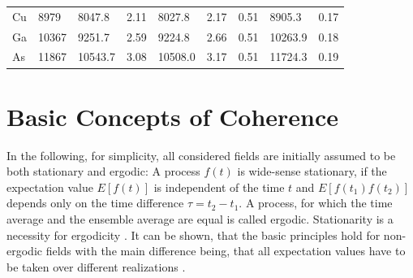 \begin{table}
\begin{tabular}{l|l|ll|lll|ll}
		Cu      & 8979                                                   & 8047.8                                                & 2.11                                                 & 8027.8                                                & 2.17                                                 & 0.51                                                      & 8905.3                                                & 0.17                                                      \\
		Ga      & 10367                                                  & 9251.7                                                 & 2.59                                                 & 9224.8                                                 & 2.66                                                 & 0.51                                                      & 10263.9                                               & 0.18                                                      \\
		As      & 11867                                                  & 10543.7                                                & 3.08                                                 & 10508.0                                                & 3.17                                                 & 0.51                                                      & 11724.3                                               & 0.19                                                      \\ \hline
	\end{tabular}
\end{table}

\section{Basic Concepts of Coherence}
In the following, for simplicity, all considered fields are initially assumed to be both stationary and ergodic: A process $f(t)$ is wide-sense stationary, if the expectation value $E[f(t)]$ is independent of the time $t$ and $E[f(t_1)f(t_2)]$ depends only on the time difference $\tau=t_2-t_1$. A process, for which the time average and the ensemble average are equal is called ergodic. Stationarity is a necessity for ergodicity \cite{goodman2000}. It can be shown, that the basic principles hold for non-ergodic fields with the main difference being, that all expectation values have to be taken over different realizations  \cite{lajunen04}.

